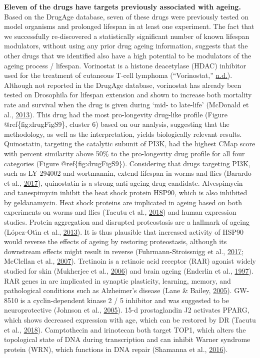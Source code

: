 \documentclass[12pt,twoside]{unicam}
\begin{document}
\textbf{Eleven of the drugs have targets previously associated with ageing.} Based on the DrugAge database, seven of these drugs were previously tested on model organisms and prolonged lifespan in at least one experiment. The fact that we successfully re-discovered a statistically significant number of known lifespan modulators, without using any prior drug ageing information, suggests that the other drugs that we identified also have a high potential to be modulators of the ageing process / lifespan. Vorinostat is a histone deacetylase (HDAC) inhibitor used for the treatment of cutaneous T-cell lymphoma (``Vorinostat,'' \protect\hyperlink{ref-vorinostat}{n.d.}). Although not reported in the DrugAge database, vorinostat has already been tested on Drosophila for lifespan extension and shown to increase both mortality rate and survival when the drug is given during `mid- to late-life' (McDonald et al., \protect\hyperlink{ref-McDonald2013}{2013}). This drug had the most pro-longevity drug-like profile (Figure @ref\{fig:drugFigS9\}, cluster 6) based on our analysis, suggesting that the methodology, as well as the interpretation, yields biologically relevant results. Quinostatin, targeting the catalytic subunit of PI3K, had the highest CMap score with percent similarity above 50\% to the pro-longevity drug profile for all four categories (Figure @ref\{fig:drugFigS9\}). Considering that drugs targeting PI3K, such as LY-294002 and wortmannin, extend lifespan in worms and flies (Barardo et al., \protect\hyperlink{ref-Barardo2017}{2017}), quinostatin is a strong anti-ageing drug candidate. Alvespimycin and tanespimycin inhibit the heat shock protein HSP90, which is also inhibited by geldanamycin. Heat shock proteins are implicated in ageing based on both experiments on worms and flies (Tacutu et al., \protect\hyperlink{ref-Tacutu2018}{2018}) and human expression studies. Protein aggregation and disrupted proteostasis are a hallmark of ageing (López-Otı́n et al., \protect\hyperlink{ref-Lopez-Otin2013}{2013}). It is thus plausible that increased activity of HSP90 would reverse the effects of ageing by restoring proteostasis, although its downstream effects might result in reverse (Fuhrmann-Stroissnigg et al., \protect\hyperlink{ref-Fuhrmann-Stroissnigg2017}{2017}; McClellan et al., \protect\hyperlink{ref-McClellan2007}{2007}). Tretinoin is a retinoic acid receptor (RAR) agonist widely studied for skin (Mukherjee et al., \protect\hyperlink{ref-Mukherjee2006}{2006}) and brain ageing (Enderlin et al., \protect\hyperlink{ref-Enderlin1997}{1997}). RAR genes in are implicated in synaptic plasticity, learning, memory, and pathological conditions such as Alzheimer's disease (Lane \& Bailey, \protect\hyperlink{ref-Lane2005}{2005}). GW-8510 is a cyclin-dependent kinase 2 / 5 inhibitor and was suggested to be neuroprotective (Johnson et al., \protect\hyperlink{ref-Johnson2005}{2005}). 15-d prostaglandin J2 activates PPARG, which shows decreased expression with age, which can be restored by DR (Tacutu et al., \protect\hyperlink{ref-Tacutu2018}{2018}). Camptothecin and irinotecan both target TOP1, which alters the topological state of DNA during transcription and can inhibit Warner syndrome protein (WRN), which functions in DNA repair (Shamanna et al., \protect\hyperlink{ref-Shamanna2016}{2016}). 
\end{document}
